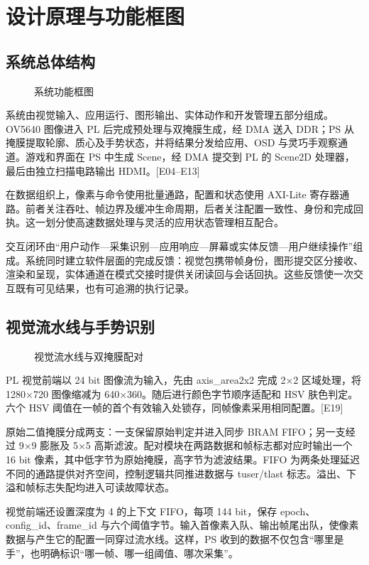 \section{设计原理与功能框图}
\subsection{系统总体结构}
\begin{figure}[htbp]\centering\caption{系统功能框图}\label{fig:1}\end{figure}
系统由视觉输入、应用运行、图形输出、实体动作和开发管理五部分组成。OV5640 图像进入 PL 后完成预处理与双掩膜生成，经 DMA 送入 DDR；PS 从掩膜提取轮廓、质心及手势状态，并将结果分发给应用、OSD 与灵巧手观察通道。游戏和界面在 PS 中生成 Scene，经 DMA 提交到 PL 的 Scene2D 处理器，最后由独立扫描电路输出 HDMI。[E04–E13]

在数据组织上，像素与命令使用批量通路，配置和状态使用 AXI-Lite 寄存器通路。前者关注吞吐、帧边界及缓冲生命周期，后者关注配置一致性、身份和完成回执。这一划分使高速数据处理与灵活的应用状态管理相互配合。

交互闭环由“用户动作—采集识别—应用响应—屏幕或实体反馈—用户继续操作”组成。系统同时建立软件层面的完成反馈：视觉包携带帧身份，图形提交区分接收、渲染和呈现，实体通道在模式交接时提供关闭读回与会话回执。这些反馈使一次交互既有可见结果，也有可追溯的执行记录。

\subsection{视觉流水线与手势识别}
\begin{figure}[htbp]\centering\caption{视觉流水线与双掩膜配对}\label{fig:2}\end{figure}
PL 视觉前端以 24 bit 图像流为输入，先由 axis\_area2x2 完成 2×2 区域处理，将 1280×720 图像缩减为 640×360。随后进行颜色字节顺序适配和 HSV 肤色判定。六个 HSV 阈值在一帧的首个有效输入处锁存，同帧像素采用相同配置。[E19]

原始二值掩膜分成两支：一支保留原始判定并进入同步 BRAM FIFO；另一支经过 9×9 膨胀及 5×5 高斯滤波。配对模块在两路数据和帧标志都对应时输出一个 16 bit 像素，其中低字节为原始掩膜，高字节为滤波结果。FIFO 为两条处理延迟不同的通路提供对齐空间，控制逻辑共同推进数据与 tuser/tlast 标志。溢出、下溢和帧标志失配均进入可读故障状态。

视觉前端还设置深度为 4 的上下文 FIFO，每项 144 bit，保存 epoch、config\_id、frame\_id 与六个阈值字节。输入首像素入队、输出帧尾出队，使像素数据与产生它的配置一同穿过流水线。这样，PS 收到的数据不仅包含“哪里是手”，也明确标识“哪一帧、哪一组阈值、哪次采集”。

